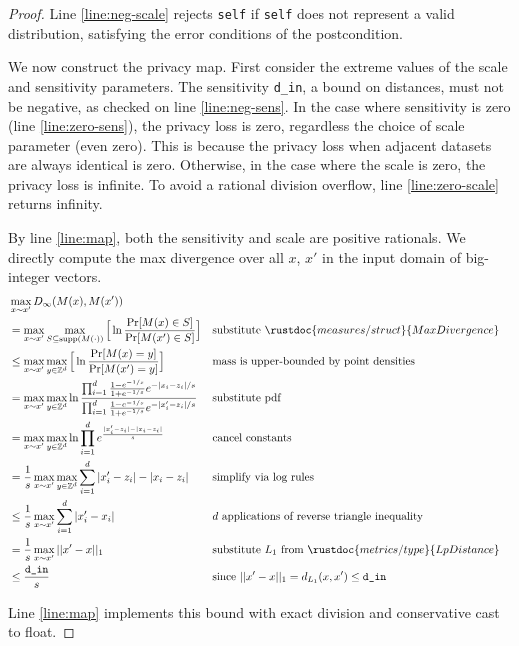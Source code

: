 \documentclass{article}
\begin{document}
\begin{proof}
    Line \ref{line:neg-scale} rejects \texttt{self} if \texttt{self} does not represent a valid distribution,
    satisfying the error conditions of the postcondition.

    We now construct the privacy map.
    First consider the extreme values of the scale and sensitivity parameters.
    The sensitivity \texttt{d\_in}, a bound on distances, must not be negative, as checked on line \ref{line:neg-sens}.
    In the case where sensitivity is zero (line \ref{line:zero-sens}), the privacy loss is zero, regardless the choice of scale parameter (even zero).
    This is because the privacy loss when adjacent datasets are always identical is zero.
    Otherwise, in the case where the scale is zero, the privacy loss is infinite.
    To avoid a rational division overflow, line \ref{line:zero-scale} returns infinity.

    By line \ref{line:map}, both the sensitivity and scale are positive rationals.
    We directly compute the max divergence over all $x$, $x'$ in the input domain of big-integer vectors.
    \begin{align}
        &\max_{x \sim x'} D_\infty(M(x), M(x')) \\
        &=\max_{x \sim x'} \max_{S \subseteq \textrm{supp}(M(\cdot))} \Big[\ln \dfrac{\Pr[M(x) \in S]}{\Pr[M(x') \in S]} \Big]
            &&\text{substitute } \rustdoc{measures/struct}{MaxDivergence} \\
        &\leq\max_{x \sim x'} \max_{y \in \mathbb{Z}^d} \Big[\ln \dfrac{\Pr[M(x) = y]}{\Pr[M(x') = y]} \Big] 
            &&\text{mass is upper-bounded by point densities}\\
        &=\max_{x \sim x'} \max_{y \in \mathbb{Z}^d} \ln \dfrac{\prod_{i=1}^d \frac{1 - e^{-1/s}}{1 + e^{-1/s}} e^{-|x_i - z_i|/s}}{\prod_{i=1}^d\frac{1 - e^{-1/s}}{1 + e^{-1/s}} e^{-|x'_i-z_i|/s}}
            &&\text{substitute pdf}\\
        &=\max_{x \sim x'} \max_{y \in \mathbb{Z}^d} \ln \prod_{i=1}^d e^{\frac{|x'_i - z_i| - |x_i - z_i|}{s}}
            &&\text{cancel constants} \\
        &=\frac{1}{s}\max_{x \sim x'} \max_{y \in \mathbb{Z}^d} \sum_{i=1}^d|x'_i - z_i| - |x_i - z_i| 
            &&\text{simplify via log rules}\\
        &\leq\frac{1}{s}\max_{x \sim x'} \sum_{i=1}^d|x'_i - x_i|
            &&d \text{ applications of reverse triangle inequality} \\
        &=\frac{1}{s}\max_{x \sim x'}||x' - x||_1
            &&\text{substitute } L_1 \text{ from } \rustdoc{metrics/type}{LpDistance} \\
        &\leq\frac{\texttt{d\_in}}{s}
            &&\text{since } ||x' - x||_1 = d_{L_1}(x, x') \leq \texttt{d\_in} \\
    \end{align}

    Line \ref{line:map} implements this bound with exact division and conservative cast to float.
\end{proof}
\end{document}
